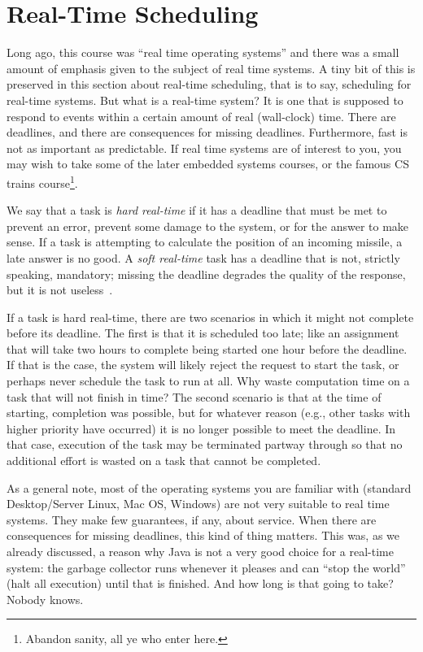 




\section*{Real-Time Scheduling}
Long ago, this course was ``real time operating systems'' and there was a small amount of emphasis given to the subject of real time systems. A tiny bit of this is preserved in this section about real-time scheduling, that is to say, scheduling for real-time systems. But what is a real-time system? It is one that is supposed to respond to events within a certain amount of real (wall-clock) time. There are deadlines, and there are consequences for missing deadlines. Furthermore, fast is not as important as predictable. If real time systems are of interest to you, you may wish to take some of the later embedded systems courses, or the famous CS trains course\footnote{Abandon sanity, all ye who enter here.}.

We say that a task is \textit{hard real-time} if it has a deadline that must be met to prevent an error, prevent some damage to the system, or for the answer to make sense. If a task is attempting to calculate the position of an incoming missile, a late answer is no good. A \textit{soft real-time} task has a deadline that is not, strictly speaking, mandatory; missing the deadline degrades the quality of the response, but it is not useless~\cite{osi}.

If a task is hard real-time, there are two scenarios in which it might not complete before its deadline. The first is that it is scheduled too late; like an assignment that will take two hours to complete being started one hour before the deadline. If that is the case, the system will likely reject the request to start the task, or perhaps never schedule the task to run at all. Why waste computation time on a task that will not finish in time? The second scenario is that at the time of starting, completion was possible, but for whatever reason (e.g., other tasks with higher priority have occurred) it is no longer possible to meet the deadline. In that case, execution of the task may be terminated partway through so that no additional effort is wasted on a task that cannot be completed.

As a general note, most of the operating systems you are familiar with (standard Desktop/Server Linux, Mac OS, Windows) are not very suitable to real time systems. They make few guarantees, if any, about service. When there are consequences for missing deadlines, this kind of thing matters. This was, as we already discussed, a reason why Java is not a very good choice for a real-time system: the garbage collector runs whenever it pleases and can ``stop the world'' (halt all execution) until that is finished. And how long is that going to take? Nobody knows.

